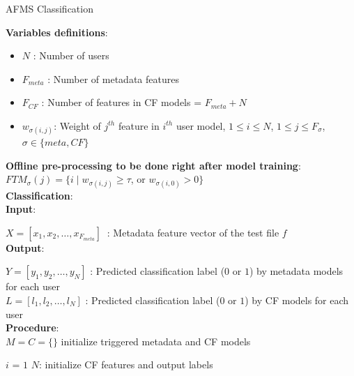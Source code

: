 \begin{algorithm*}[t!]
  \fontsize{8pt}{1em}\selectfont
  \caption{AFMS Classification}
  \label{algo:AFMSClassification}
  \vspace{0.3cm}
  \textbf{Variables definitions}:

  \begin{itemize}
      \renewcommand{\labelitemi}{}
  \item $N$ \tab: Number of users
  \item $F_{meta}$ \tab: Number of metadata features
  \item $F_{CF}$ \tab: Number of features in CF models = $F_{meta} + N$
  \item $w_{\sigma(i, j)}$\tab: Weight of $j^{th}$ feature in $i^{th}$ user
  model, $1 \le i \le N$, $1 \le j \le F_\sigma$, $\sigma \in \{meta,
    CF\}$
  \end{itemize}

  \textbf{Offline pre-processing to be done right after model training}:\\

  \quad $FTM_{\sigma}(j) = \{ i \mid w_{\sigma(i, j)} \ge \tau$, or
      $w_{\sigma(i, 0)} > 0 \}$\\

  \textbf{Classification}:\\

  \quad \textbf{Input}:
  
  \quad\quad $X = [x_1, x_2, \dots, x_{F_{meta}}]\>$ :  Metadata feature
  vector of the test file $f$\\
  
  \quad \textbf{Output}:
  
  \quad\quad $Y = [y_1, y_2, \dots, y_N]$ \qquad  : Predicted classification label ($0$ or $1$) by metadata models for each user \\ 

  \quad\quad $L = [l_1, l_2, \dots, l_N]$ \qquad\quad : Predicted classification label ($0$ or $1$) by CF models for
  each user\\
  
  \quad \textbf{Procedure}:\\

  \quad\quad $M = C = \{\}$ \qquad\qquad \thinspace\thinspace\thinspace\thinspace\thinspace \codecomment initialize
  triggered metadata and CF models
  
  \quad\quad {} $i$ = $1$  $N$:
  \qquad\quad\enspace\thinspace\thinspace\thinspace \thinspace\codecomment initialize CF features and output labels


\end{algorithm*}
